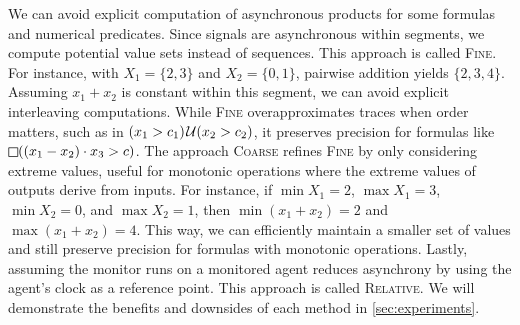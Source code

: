 We can avoid explicit computation of asynchronous products for some formulas and numerical predicates.
Since signals are asynchronous within segments, we compute potential value sets instead of sequences.
\alert{This approach is called \textsc{Fine}.}
For instance, with $X_1 = \{2,3\}$ and $X_2 = \{0,1\}$, pairwise addition yields $\{2, 3, 4\}$.
Assuming $x_1 + x_2$ is constant within this segment, we can avoid explicit interleaving computations.
While \textsc{Fine} overapproximates traces when order matters, such as in $(x_1 > c_1) \kern.1em\mathcal{U} (x_2 > c_2)$, it preserves precision for formulas like $\LTLalways((x_1 - x_2) \cdot x_3 > c)$.
\alert{The approach \textsc{Coarse}} refines \textsc{Fine} by only considering extreme values, useful for monotonic operations where the extreme values of outputs derive from inputs.
For instance, if $\min X_1 = 2$, $\max X_1 = 3$, $\min X_2 = 0$, and $\max X_2 = 1$, then $\min(x_1 + x_2) = 2$ and $\max(x_1 + x_2) = 4$.
This way, we can efficiently maintain a smaller set of values and still preserve precision for formulas with monotonic operations.
Lastly, assuming the monitor runs on a monitored agent reduces asynchrony by using the agent's clock as a reference point.
\alert{This approach is called \textsc{Relative}.}
We will demonstrate the benefits and downsides of each method in \cref{sec:experiments}.

